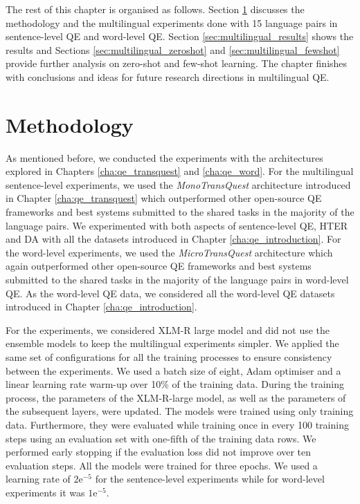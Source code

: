 The rest of this chapter is organised as follows. Section \ref{sec:multilingual_method} discusses the methodology and the multilingual experiments done with 15 language pairs in sentence-level QE and word-level QE.  Section \ref{sec:multilingual_results} shows the results and Sections \ref{sec:multilingual_zeroshot} and \ref{sec:multilingual_fewshot} provide further analysis on zero-shot and few-shot learning. The chapter finishes with conclusions and ideas for future research directions in multilingual QE.
 

\section{Methodology}
\label{sec:multilingual_method}
As mentioned before, we conducted the experiments with the architectures explored in Chapters \ref{cha:qe_transquest} and \ref{cha:qe_word}. For the multilingual sentence-level experiments, we used the \textit{MonoTransQuest} architecture introduced in Chapter \ref{cha:qe_transquest} which outperformed other open-source QE frameworks and best systems submitted to the shared tasks in the majority of the language pairs. We experimented with both aspects of sentence-level QE, HTER and DA with all the datasets introduced in Chapter \ref{cha:qe_introduction}. For the word-level experiments, we used the \textit{MicroTransQuest} architecture which again outperformed other open-source QE frameworks and best systems submitted to the shared tasks in the majority of the language pairs in word-level QE. As the word-level QE data, we considered all the word-level QE datasets introduced in Chapter \ref{cha:qe_introduction}.

For the experiments, we considered XLM-R large model and did not use the ensemble models to keep the multilingual experiments simpler. We applied the same set of configurations for all the training processes to ensure consistency between the experiments. We used a batch size of eight, Adam optimiser and a linear learning rate warm-up over 10\% of the training data. During the training process, the parameters of the XLM-R-large model, as well as the parameters of the subsequent layers, were updated. The models were trained using only training data. Furthermore, they were evaluated while training once in every 100 training steps using an evaluation set with one-fifth of the training data rows. We performed early stopping if the evaluation loss did not improve over ten evaluation steps. All the models were trained for three epochs. We used a learning rate of $2\mathrm{e}^{-5}$ for the sentence-level experiments while for word-level experiments it was $1\mathrm{e}^{-5}$. 



